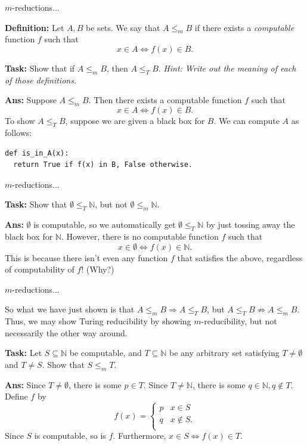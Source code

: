 \documentclass{beamer}
\newcommand{\N}{\mathbb N}
\begin{document}
\begin{frame}[fragile]{$m$-reductions...}

\textbf{Definition:} Let $A, B$ be sets. We say that $A \leq_m B$ if there exists a \textit{computable} function $f$ such that 
$$x \in A \Leftrightarrow f(x) \in B.$$

\textbf{Task:} Show that if $A \leq_m B$, then $A \leq_T B$. \textit{Hint: Write out the meaning of each of those definitions.}

\textbf{Ans:} Suppose $A \leq_m B$. Then there exists a computable function $f$ such that
$$x \in A \Leftrightarrow f(x) \in B.$$
To show $A \leq_T B$, suppose we are given a black box for $B$. We can compute $A$ as follows:
\begin{verbatim}
def is_in_A(x):
  return True if f(x) in B, False otherwise.
\end{verbatim}

\end{frame}

\begin{frame}[fragile]{$m$-reductions...}

\textbf{Task:} Show that $\emptyset \leq_T \N$, but not $\emptyset \leq_m \N$.

\pause

\textbf{Ans:} $\emptyset$ is computable, so we automatically get $\emptyset \leq_T \N$ by just tossing away the black box for $\N$. However, there is no computable function $f$ such that $$x \in \emptyset \Leftrightarrow f(x) \in \N.$$
This is because there isn't even any function $f$ that satisfies the above, regardless of computability of $f$! (Why?)

\end{frame}


\begin{frame}[fragile]{$m$-reductions...}

So what we have just shown is that $A \leq_m B \Rightarrow A \leq_T B$, but $A \leq_T B \not \Rightarrow A \leq_m B$. Thus, we may show Turing reducibility by showing $m$-reducibility, but not necessarily the other way around.

\vspace{2mm}

\pause

\textbf{Task:} Let $S \subseteq \N$ be computable, and $T \subseteq \N$ be any arbitrary set satisfying $T \neq \emptyset$ and $T \neq S$. Show that $S \leq_m T$.

\pause

\vspace{2mm}

\textbf{Ans:} Since $T \neq \emptyset$, there is some $p \in T$. Since $T \neq \N$, there is some $q \in \N, q \notin T$. Define $f$ by
$$f(x) = \begin{cases}
p & x \in S\\
q & x \notin S.\\
\end{cases}$$
Since $S$ is computable, so is $f$. Furthermore, $x \in S \Leftrightarrow f(x) \in T$.

\end{frame}
\end{document}
